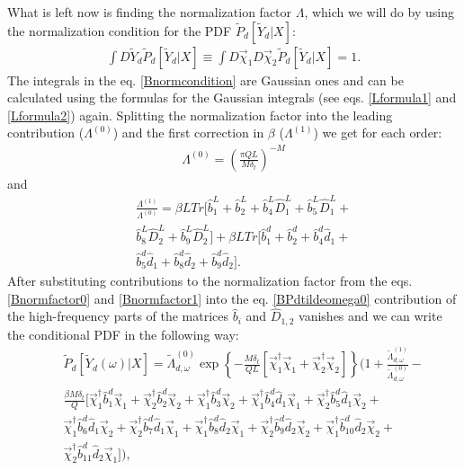 \documentclass{article}
\begin{document}
What is left now is finding the normalization factor $\Lambda$, which we will do by using the normalization condition for the PDF $\tilde{P}_{d}[\tilde{Y}_{d}|X]$:
\begin{eqnarray}\label{Bnormcondition}
    \int D\tilde{Y}_{d} \tilde{P}_{d}[\tilde{Y}_{d}|X] \equiv \int D\vec{\chi}_{1}D\vec{\chi}_{2} \tilde{P}_{d}[\tilde{Y}_{d}|X] = 1.
\end{eqnarray}
The integrals in the eq. \eqref{Bnormcondition} are Gaussian ones and can be calculated using the formulas for the Gaussian integrals (see eqs. \eqref{Lformula1} and \eqref{Lformula2}) again. Splitting the normalization factor into the leading contribution ($\Lambda^{(0)}$) and the first correction in $\beta$ ($\Lambda^{(1)}$) we get for each order: 
\begin{eqnarray}\label{Bnormfactor0}
    \Lambda^{(0)} = \left(\frac{\pi Q L}{M\delta_{t}}\right)^{-M}
\end{eqnarray}
and 
\begin{eqnarray}\label{Bnormfactor1}
    &&\frac{\Lambda^{(1)}}{\Lambda^{(0)}} = \beta LTr\Big[\hat{b}_{1}^{L} + \hat{b}_{2}^{L} + \hat{b}_{4}^{L} \hat{D}_{1}^{L} + \hat{b}_{5}^{L} \hat{D}_{1}^{L} +\nonumber\\
    &&\hat{b}_{8}^{L} \hat{D}_{2}^{L} + \hat{b}_{9}^{L} \hat{D}_{2}^{L} \Big] + \beta LTr\Big[\hat{b}_{1}^{d} + \hat{b}_{2}^{d} + \hat{b}_{4}^{d} \hat{d}_{1} + \nonumber\\
    &&\hat{b}_{5}^{d} \hat{d}_{1} + \hat{b}_{8}^{d} \hat{d}_{2} + \hat{b}_{9}^{d} \hat{d}_{2}\Big].
\end{eqnarray}
After substituting contributions to the normalization factor from the eqs. \eqref{Bnormfactor0} and \eqref{Bnormfactor1} into the eq. \eqref{BPdtildeomega0} contribution of the high-frequency parts of the matrices $\hat{b}_{i}$ and $\hat{D}_{1,2}$ vanishes and we can write the conditional PDF in the following way: 
\begin{eqnarray}\label{BPdtildeomega1}
    &&\tilde{P}_{d}[\tilde{Y}_{d}(\omega)|X] = \tilde{\Lambda}_{d,\omega}^{(0)} \exp\left\{-\frac{M\delta_{t}}{QL}[\vec{\chi}_{1}^{\dag}\vec{\chi}_{1} + \vec{\chi}_{2}^{\dag}\vec{\chi}_{2}]\right\}\Big(1 + \frac{\tilde{\Lambda}_{d,\omega}^{(1)}}{\tilde{\Lambda}_{d,\omega}^{(0)}} -\nonumber\\
    &&\frac{\beta M \delta_{t}}{Q} \Big[\vec{\chi}_{1}^{\dag}\hat{b}_{1}^{d}\vec{\chi}_{1} +\vec{\chi}_{2}^{\dag}\hat{b}_{2}^{d}\vec{\chi}_{2} + \vec{\chi}_{1}^{\dag}\hat{b}_{3}^{d}\vec{\chi}_{2} + \vec{\chi}_{1}^{\dag}\hat{b}_{4}^{d}\hat{d}_{1}\vec{\chi}_{1} +\vec{\chi}_{2}^{\dag}\hat{b}_{5}^{d}\hat{d}_{1}\vec{\chi}_{2} + 
    \nonumber\\
    &&\vec{\chi}_{1}^{\dag}\hat{b}_{6}^{d}\hat{d}_{1}\vec{\chi}_{2} + \vec{\chi}_{2}^{\dag}\hat{b}_{7}^{d}\hat{d}_{1}\vec{\chi}_{1} +\vec{\chi}_{1}^{\dag}\hat{b}_{8}^{d}\hat{d}_{2}\vec{\chi}_{1} + 
    \vec{\chi}_{2}^{\dag}\hat{b}_{9}^{d}\hat{d}_{2}\vec{\chi}_{2} + \vec{\chi}_{1}^{\dag}\hat{b}_{10}^{d}\hat{d}_{2}\vec{\chi}_{2} +\nonumber\\
    &&\vec{\chi}_{2}^{\dag}\hat{b}_{11}^{d}\hat{d}_{2}\vec{\chi}_{1}\Big] \Big),
\end{eqnarray}
\end{document}
